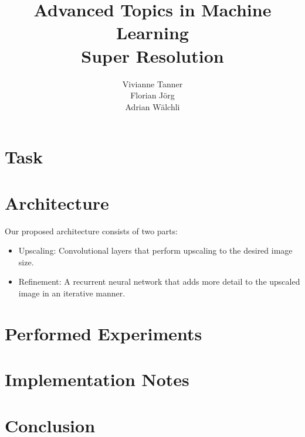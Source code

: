 \documentclass[a4paper]{article}
\title{Advanced Topics in Machine Learning\\Super Resolution}
\author{Vivianne Tanner \\Florian J\"org \\Adrian W\"alchli}
\begin{document}
\maketitle

\section{Task}



\section{Architecture}

Our proposed architecture consists of two parts:
\begin{itemize}
	\item 	Upscaling: Convolutional layers that perform upscaling to the desired image size. 
	\item 	Refinement: A recurrent neural network that adds more detail to the upscaled image in an iterative manner.
			
\end{itemize}

\section{Performed Experiments}

\section{Implementation Notes}


\section{Conclusion}
\end{document}

